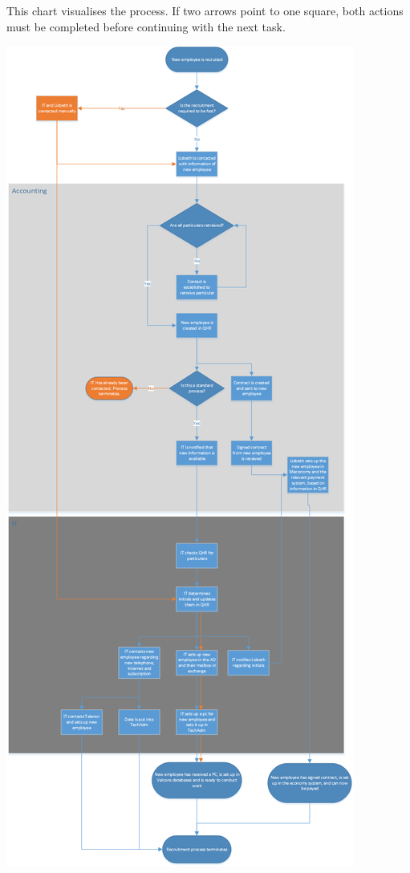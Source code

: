 \label{app:ProcessChart}

This chart visualises the process.
If two arrows point to one square, both actions must be completed before continuing with the next task.

\includegraphics[scale=0.325]{appendix/ProcessFlowChart.png}